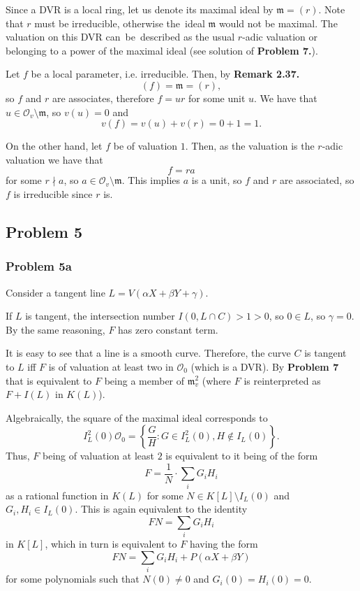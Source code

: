 Since a DVR is a local ring, let us denote its maximal ideal by 
\( \mathfrak{m} = (r) \). Note that \( r \) must be irreducible, otherwise
the~ideal \( \mathfrak{m} \) would not be maximal. The valuation on this DVR
can~be~described as the usual \( r \)-adic valuation or belonging to a power of 
the maximal ideal (see solution of {\bf Problem 7.}).

Let \( f \) be a local parameter, i.e. irreducible. Then, by {\bf Remark 2.37.}
\[ 
    (f) = \mathfrak{m} = (r), 
\]
so \( f \) and \( r \) are associates, therefore \( f = ur \) for some unit \( u \).
We have that \( u \in \mathcal{O}_v \setminus \mathfrak{m} \), so \( v(u) = 0 \) and
\[ 
    v(f) = v(u) + v(r) = 0 + 1 = 1. 
\]

On the other hand, let \( f \) be of valuation \( 1 \). Then, as the valuation
is the \( r \)-adic valuation we have that
\[ 
    f = ra 
\]
for some \( r \nmid a \), so \( a \in \mathcal{O}_v \setminus \mathfrak{m} \).
This implies \( a \) is a unit, so \( f \) and \( r \) are associated,
so \( f \) is irreducible since \( r \) is.

\subsection*{Problem 5}

\subsubsection*{Problem 5a}

Consider a tangent line 
\( L = V(\alpha X + \beta Y + \gamma )\).

If \( L \) is tangent, the intersection number \( I(0, L \cap C)  > 1 > 0 \),
so \( 0 \in L \), so \( \gamma = 0 \). By the same reasoning, \( F \) has zero
constant term.

It is easy to see that a line is a smooth curve. Therefore, the curve \( C \)
is tangent to \( L \) iff \( F \) is of valuation at least two in \( \mathcal{O}_0 \)
(which is a DVR). By {\bf Problem 7} that is equivalent to \( F \) being a 
member of \( \mathfrak{m}^2_v \) (where \( F \) is reinterpreted
as \( F + I(L) \) in \( K(L) \)).

Algebraically, the square of the maximal ideal corresponds to
\[ 
    I^2_L(0) \mathcal{O}_0 = \left\{ \frac{G}{H} : G \in I^2_L(0), H \not\in I_L(0)\right \} .
\]
Thus, \( F \) being of valuation at least \( 2 \) is equivalent to it being of the form
\[ 
    F = \frac{1}{N} \cdot \sum_i G_i H_i  
\]
as a rational function in \( K(L) \) for some \( N \in K[L] \setminus I_L(0)\)
and \( G_i, H_i \in I_L(0) \). This is again equivalent to the identity
\[ 
    FN = \sum_i G_i H_i 
\]
in \( K[L] \), which in turn is equivalent to \( F \) having the form
\[ 
    FN = \sum_i G_i H_i + P(\alpha X + \beta Y)
\]
for some polynomials such that \( N(0) \neq 0 \) and \( G_i (0) = H_i(0) = 0 \).

